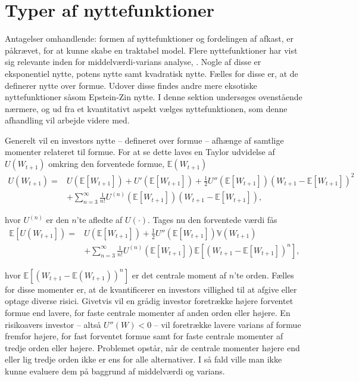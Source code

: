 \documentclass[
  a4paper,
  oneside]{memoir}
\begin{document}
\hypertarget{typnyt}{%
\section{Typer af nyttefunktioner}\label{typnyt}}

Antagelser omhandlende: formen af nyttefunktioner og fordelingen af afkast, er påkrævet, for at kunne skabe en traktabel model. Flere nyttefunktioner har vist sig relevante inden for middelværdi-varians analyse, \citep{CampVic2003}. Nogle af disse er eksponentiel nytte, potens nytte samt kvadratisk nytte. Fælles for disse er, at de definerer nytte over formue. Udover disse findes andre mere eksotiske nyttefunktioner såsom Epstein-Zin nytte. I denne sektion undersøges ovenstående nærmere, og ud fra et kvantitativt aspekt vælges nyttefunktionen, som denne afhandling vil arbejde videre med.

Generelt vil en investors nytte -- defineret over formue -- afhænge af samtlige momenter relateret til formue. For at se dette laves en Taylor udvidelse af \(U(W_{t+1})\) omkring den forventede formue, \(\mathbb{E}(W_{t+1})\)
\begin{align*}
U\left(W_{t+1}\right)=&U\left(\mathbb{E}\left[W_{t+1}\right]\right)+U'\left(\mathbb{E}\left[W_{t+1}\right]\right)+\frac{1}{2}U''\left(\mathbb{E}\left[W_{t+1}\right]\right)\left(W_{t+1}-\mathbb{E}\left[W_{t+1}\right]\right)^2\\
&+\sum_{n=3}^\infty \frac{1}{n!}U^{\left(n\right)}\left(\mathbb{E}\left[W_{t+1}\right]\right)\left(W_{t+1}-\mathbb{E}\left[W_{t+1}\right]\right),
\end{align*}

hvor \(U^{(n)}\) er den \(n\)'te afledte af \(U(\cdot)\). Tages nu den forventede værdi fås
\begin{align*}
\mathbb{E}\left[U\left(W_{t+1}\right]\right)=&U\left(\mathbb{E}\left[W_{t+1}\right]\right)+\frac{1}{2}U''\left(\mathbb{E}\left[W_{t+1}\right]\right)\mathbb{V}\left(W_{t+1}\right)\\
&+\sum_{n=3}^\infty \frac{1}{n!} U^{\left(n\right)}\left(\mathbb{E}\left[W_{t+1}\right]\right)\mathbb{E}\left[\left(W_{t+1}-\mathbb{E}\left[W_{t+1}\right]\right)^n\right],
\end{align*}

hvor \(\mathbb{E}\left[(W_{t+1}-\mathbb{E}(W_{t+1}))^n\right]\) er det centrale moment af \(n\)'te orden. Fælles for disse momenter er, at de kvantificerer en investors villighed til at afgive eller optage diverse risici. Givetvis vil en grådig investor foretrække højere forventet formue end lavere, for faste centrale momenter af anden orden eller højere. En risikoavers investor -- altså \(U''(W)<0\) -- vil foretrække lavere varians af formue fremfor højere, for fast forventet formue samt for faste centrale momenter af tredje orden eller højere. Problemet opstår, når de centrale momenter højere end eller lig tredje orden ikke er ens for alle alternativer. I så fald ville man ikke kunne evaluere dem på baggrund af middelværdi og varians.
\end{document}
